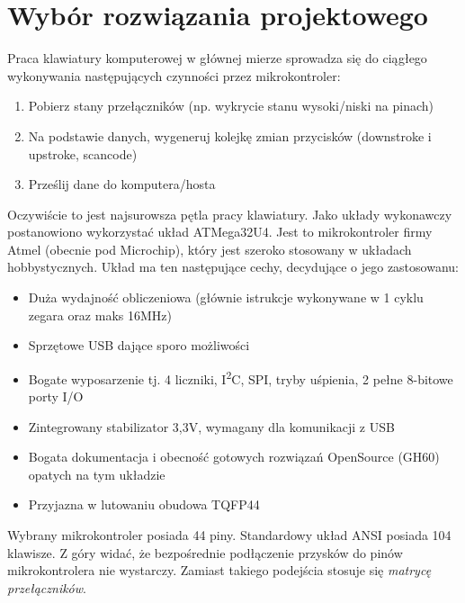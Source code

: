 \documentclass{article}
\begin{document}
    \section{Wybór rozwiązania projektowego}
    Praca klawiatury komputerowej w głównej mierze sprowadza się do ciągłego wykonywania następujących
    czynności przez mikrokontroler:
    \begin{enumerate}
        \item Pobierz stany przełączników (np. wykrycie stanu wysoki/niski na pinach)
        \item Na podstawie danych, wygeneruj kolejkę zmian przycisków (downstroke i upstroke, scancode)
        \item Prześlij dane do komputera/hosta
    \end{enumerate}
    Oczywiście to jest najsurowsza pętla pracy klawiatury. Jako układy wykonawczy postanowiono wykorzystać
    układ ATMega32U4. Jest to mikrokontroler firmy Atmel (obecnie pod Microchip), który jest szeroko stosowany
    w układach hobbystycznych. Układ ma ten następujące cechy, decydujące o jego zastosowanu:
    \begin{itemize}
        \item Duża wydajność obliczeniowa (głównie istrukcje wykonywane w 1 cyklu zegara oraz maks 16MHz)
        \item Sprzętowe USB dające sporo możliwości
        \item Bogate wyposarzenie tj. 4 liczniki,  I\textsuperscript{2}C, SPI, tryby uśpienia, 2 pełne 8-bitowe porty I/O
        \item Zintegrowany stabilizator 3,3V, wymagany dla komunikacji z USB
        \item Bogata dokumentacja i obecność gotowych rozwiązań OpenSource (GH60) opatych na tym układzie
        \item Przyjazna w lutowaniu obudowa TQFP44
    \end{itemize}
    Wybrany mikrokontroler posiada 44 piny. Standardowy układ ANSI posiada 104 klawisze. Z góry widać, że bezpośrednie
    podłączenie przysków do pinów mikrokontrolera nie wystarczy. Zamiast takiego podejścia stosuje się \emph{matrycę przełączników}.
    \newpage
\end{document}
